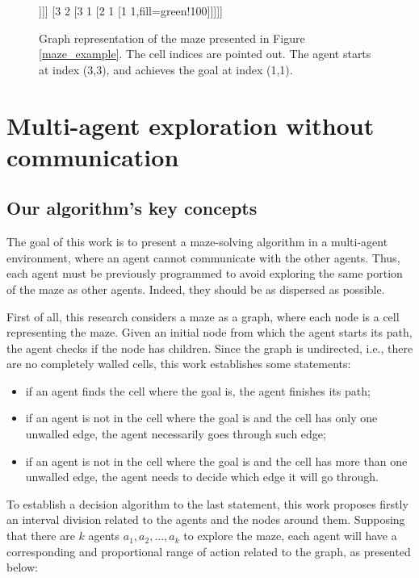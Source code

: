 \begin{figure}[ht!]
\centering
\begin{forest}
 [3 3,for tree={circle,draw},s sep=12mm,fill=red!100
 	[2 3
 		[2 2
 			[1 2
 				[1 3]]]]
 	[3 2
 		[3 1
 			[2 1
 				[1 1,fill=green!100]]]]]
\end{forest}
\caption{Graph representation of the maze presented in Figure \ref{maze_example}. The cell indices are pointed out. The agent starts at index (3,3), and achieves the goal at index (1,1).}
\label{maze_example_graph}
\end{figure}



\section{Multi-agent exploration without communication}
\label{section_models_exploration}
\subsection{Our algorithm's key concepts}
The goal of this work is to present a maze-solving algorithm in a multi-agent environment, where an agent cannot communicate with the other agents. Thus, each agent must be previously programmed to avoid exploring the same portion of the maze as other agents. Indeed, they should be as dispersed as possible.

First of all, this research considers a maze as a graph, where each node is a cell representing the maze. Given an initial node from which the agent starts its path, the agent checks if the node has children. Since the graph is undirected, i.e., there are no completely walled cells, this work establishes some statements:

\begin{itemize}
\item if an agent finds the cell where the goal is, the agent finishes its path;

\item if an agent is not in the cell where the goal is and the cell has only one unwalled edge, the agent necessarily goes through such edge;

\item if an agent is not in the cell where the goal is and the cell has more than one unwalled edge, the agent needs to decide which edge it will go through.
\end{itemize}

To establish a decision algorithm to the last statement, this work proposes firstly an interval division related to the agents and the nodes around them. Supposing that there are $k$ agents $a_{1}, a_{2},...,a_{k}$ to explore the maze, each agent will have a corresponding and proportional range of action related to the graph, as presented below:

